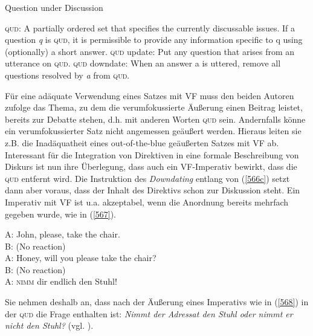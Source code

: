 \begin{exe}
	\ex\label{566} Question under Discussion 
		\begin{xlist}	
			\ex\label{566a} \textsc{qud}: A partially ordered set that specifies the currently discussable issues. If
	 		a question \textit{q} is \textsc{qud}, it is permissible to provide any information specific to q using (optionally) 			a short answer.
			\ex\label{566b} \textsc{qud} update: Put any question that arises from an utterance on \textsc{qud}.
			\ex\label{566c} \textsc{qud} downdate: When an answer a is uttered, remove all questions resolved by \textit{a} from 			\textsc{qud}.	
			\hfill\hbox {\citet[95]{Engdahl2006}}
		\end{xlist}
\end{exe}
Für eine adäquate Verwendung eines Satzes mit VF muss den beiden Autoren zufolge das Thema, zu dem die verumfokussierte Äußerung einen Beitrag leistet, bereits zur Debatte stehen, d.h. mit anderen Worten \textsc{qud} sein. Andernfalls könne ein verumfokussierter Satz nicht angemessen geäußert werden. Hieraus leiten sie z.B. die Inadäquatheit eines out-of-the-blue geäußerten Satzes mit VF ab. Interessant für die Integration von Direktiven in eine formale Beschreibung von Diskurs ist nun ihre Überlegung, dass auch ein VF-Imperativ bewirkt, dass die \textsc{qud} entfernt wird. Die Instruktion des \textit{Downdating}  entlang von (\ref{566c}) setzt dann aber voraus, dass der Inhalt des Direktivs schon zur Diskussion steht. Ein Impe\-rativ mit VF ist u.a. akzeptabel, wenn die Anordnung bereits mehrfach gegeben wurde, wie in (\ref{567}).

\begin{exe}
	\ex\label{567}  
	A: John, please, take the chair.\\
	B: (No reaction)\\
	A: Honey, will you please take the chair?\\
	B: (No reaction)\\
	A: \textsc{nimm} dir endlich den Stuhl!
\hfill\hbox {\citet[163]{Gutzmann2011}}
\end{exe}
Sie nehmen deshalb an, dass nach der Äußerung eines Imperativs  wie in (\ref{568}) in der \textsc{qud} die Frage enthalten ist: \textit{Nimmt der Adressat den Stuhl oder nimmt er nicht den Stuhl?} (vgl. \citealt[163]{Gutzmann2011}).

